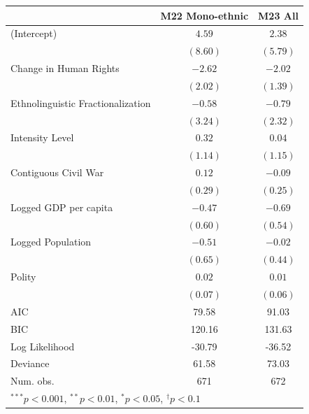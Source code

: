 \documentclass[12pt,]{book}
\let\origtable\table
\let\endorigtable\endtable
\renewenvironment{table}[1][2] {
    \singlespacing
    \expandafter\origtable\expandafter[H]
} {
    \endorigtable
}
\theoremstyle{definition}
\theoremstyle{definition}
\theoremstyle{definition}
\theoremstyle{remark}
\begin{document}
\begin{table}
\begin{center}
\begin{tabular}{l c c }
\hline
 & M22 Mono-ethnic & M23 All \\
\hline
(Intercept)                       & $4.59$   & $2.38$   \\
                                  & $(8.60)$ & $(5.79)$ \\
Change in Human Rights            & $-2.62$  & $-2.02$  \\
                                  & $(2.02)$ & $(1.39)$ \\
Ethnolinguistic Fractionalization & $-0.58$  & $-0.79$  \\
                                  & $(3.24)$ & $(2.32)$ \\
Intensity Level                   & $0.32$   & $0.04$   \\
                                  & $(1.14)$ & $(1.15)$ \\
Contiguous Civil War              & $0.12$   & $-0.09$  \\
                                  & $(0.29)$ & $(0.25)$ \\
Logged GDP per capita             & $-0.47$  & $-0.69$  \\
                                  & $(0.60)$ & $(0.54)$ \\
Logged Population                 & $-0.51$  & $-0.02$  \\
                                  & $(0.65)$ & $(0.44)$ \\
Polity                            & $0.02$   & $0.01$   \\
                                  & $(0.07)$ & $(0.06)$ \\
\hline
AIC                               & 79.58    & 91.03    \\
BIC                               & 120.16   & 131.63   \\
Log Likelihood                    & -30.79   & -36.52   \\
Deviance                          & 61.58    & 73.03    \\
Num. obs.                         & 671      & 672      \\
\hline
\multicolumn{3}{l}{\scriptsize{$^{***}p<0.001$, $^{**}p<0.01$, $^*p<0.05$, $^{\dagger}p<0.1$}}
\end{tabular}
\caption{Rare Events Logit Models of Alliance Formation (Secessionist Conflicts Only)}
\label{tab:alliance-sec}
\end{center}
\end{table}
\end{document}
